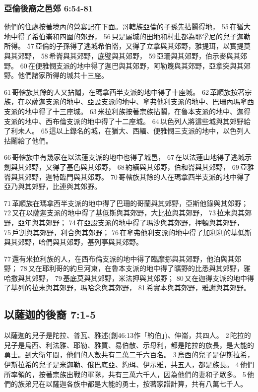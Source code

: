 \subsubsection{亞倫後裔之邑郊 6:54-81}
他們的住處按著境內的營寨記在下面。哥轄族亞倫的子孫先拈鬮得地， 55 在猶大地中得了希伯崙和四圍的郊野， 56 只是屬城的田地和村莊都為耶孚尼的兒子迦勒所得。 57 亞倫的子孫得了逃城希伯崙，又得了立拿與其郊野，雅提珥，以實提莫與其郊野， 58 希崙與其郊野，底璧與其郊野， 59 亞珊與其郊野，伯示麥與其郊野。 60 在便雅憫支派的地中得了迦巴與其郊野，阿勒篾與其郊野，亞拿突與其郊野。他們諸家所得的城共十三座。

61 哥轄族其餘的人又拈鬮，在瑪拿西半支派的地中得了十座城。 62 革順族按著宗族，在以薩迦支派的地中、亞設支派的地中、拿弗他利支派的地中、巴珊內瑪拿西支派的地中得了十三座城。 63 米拉利族按著宗族拈鬮，在魯本支派的地中、迦得支派的地中、西布倫支派的地中得了十二座城。 64 以色列人將這些城與其郊野給了利未人。 65 這以上錄名的城，在猶大、西緬、便雅憫三支派的地中，以色列人拈鬮給了他們。

66 哥轄族中有幾家在以法蓮支派的地中也得了城邑， 67 在以法蓮山地得了逃城示劍與其郊野，又得了基色與其郊野， 68 約緬與其郊野，伯和崙與其郊野， 69 亞雅崙與其郊野，迦特臨門與其郊野。 70 哥轄族其餘的人在瑪拿西半支派的地中得了亞乃與其郊野，比連與其郊野。

71 革順族在瑪拿西半支派的地中得了巴珊的哥蘭與其郊野，亞斯他錄與其郊野； 72 又在以薩迦支派的地中得了基低斯與其郊野，大比拉與其郊野， 73 拉末與其郊野，亞年與其郊野； 74 在亞設支派的地中得了瑪沙與其郊野，押頓與其郊野， 75 戶割與其郊野，利合與其郊野； 76 在拿弗他利支派的地中得了加利利的基低斯與其郊野，哈們與其郊野，基列亭與其郊野。

77 還有米拉利族的人，在西布倫支派的地中得了臨摩挪與其郊野，他泊與其郊野； 78 又在耶利哥的約旦河東，在魯本支派的地中得了曠野的比悉與其郊野，雅哈撒與其郊野， 79 基底莫與其郊野，米法押與其郊野； 80 又在迦得支派的地中得了基列的拉末與其郊野，瑪哈念與其郊野， 81 希實本與其郊野，雅謝與其郊野。


\subsection{以薩迦的後裔 7:1-5 }
以薩迦的兒子是陀拉、普瓦、雅述(創46:13作「約伯」)、伸崙，共四人。 2 陀拉的兒子是烏西、利法雅、耶勒、雅買、易伯散、示母利，都是陀拉的族長，是大能的勇士。到大衛年間，他們的人數共有二萬二千六百名。 3 烏西的兒子是伊斯拉希，伊斯拉希的兒子是米迦勒、俄巴底亞、約珥、伊示雅，共五人，都是族長。 4 他們所率領的，按著宗族出戰的軍隊，共有三萬六千人，因為他們的妻和子眾多。 5 他們的族弟兄在以薩迦各族中都是大能的勇士，按著家譜計算，共有八萬七千人。


